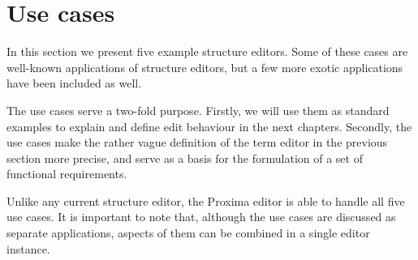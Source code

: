 \section{Use cases}
\label{sect:usecases}

In this section we present five example structure editors. Some of these cases are well-known applications of structure editors, but a few more exotic applications have been included as well.

The use cases serve a two-fold purpose. Firstly, we will use them as standard examples to explain and define edit behaviour in the next chapters. Secondly, the use cases make the rather vague definition of the term editor in the previous section more precise, and serve as a basis for the formulation of a set of functional requirements. 

Unlike any current structure editor, the Proxima editor is able to handle all five use cases. It is important to note that, although the use cases are discussed as separate applications, aspects of them can be combined in a single editor instance.

\newcommand{\screenshot}[2]{%
%
\noindent 
\begin{center}
\begin{picture}(250,180)(0,0)
\begin{tiny}
\put(0,30){ \framebox(250,150){#1}}
\end{tiny}
\put(0,0) { \makebox(250,30){#2}}
\end{picture}
\end{center}
}

\newcommand{\smallScreenshot}[2]{%
%
\noindent
\begin{center}
\begin{picture}(170,130)(0,0)
\begin{tiny}
\put(0,30){ \framebox(170,100){#1}}
\end{tiny}
\put(0,0) { \makebox(170,30){#2}}
\end{picture}
\end{center}
}

\newcommand{\editScreenshot}[4]{%
%
\noindent
\begin{center}
\begin{picture}(350,130)(0,0)
\begin{tiny}
\put(0,30){ \framebox(170,100){#1}}
\put(180,30){ \framebox(170,100){#2}}
\end{tiny}
\put(170,13){ $\Rightarrow$}
\put(0,0) { \makebox(170,30){#3}}
\put(180,0) { \makebox(170,30){#4}}
\end{picture}
\end{center}
}


